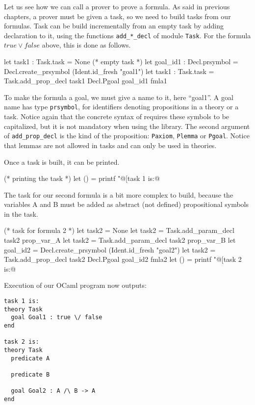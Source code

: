Let us see how we can call a prover to prove a formula. As said in
previous chapters, a prover must be given a task, so we need to build
tasks from our formulas. Task can be build incrementally from an empty
task by adding declaration to it, using the functions
\texttt{add\_*\_decl} of module \texttt{Task}. For the formula $\mathit{true} \lor
\mathit{false}$ above, this is done as follows.
\begin{ocamlcode}
let task1 : Task.task = None (* empty task *)
let goal_id1 : Decl.prsymbol =
  Decl.create_prsymbol (Ident.id_fresh "goal1")
let task1 : Task.task =
  Task.add_prop_decl task1 Decl.Pgoal goal_id1 fmla1
\end{ocamlcode}
To make the formula a goal, we must give a name to it, here ``goal1''. A
goal name has type \texttt{prsymbol}, for identifiers denoting
propositions in a theory or a task. Notice again that the concrete
syntax of \why requires these symbols to be capitalized, but it is not
mandatory when using the library. The second argument of
\texttt{add\_prop\_decl} is the kind of the proposition:
\texttt{Paxiom}, \texttt{Plemma} or \texttt{Pgoal}.
Notice that lemmas are not allowed in tasks
and can only be used in theories.

Once a task is built, it can be printed.
\begin{ocamlcode}
(* printing the task *)
let () = printf "@[task 1 is:@\n%
\end{ocamlcode}

The task for our second formula is a bit more complex to build, because
the variables A and B must be added as abstract (\ie not defined)
propositional symbols in the task.
\begin{ocamlcode}
(* task for formula 2 *)
let task2 = None
let task2 = Task.add_param_decl task2 prop_var_A
let task2 = Task.add_param_decl task2 prop_var_B
let goal_id2 = Decl.create_prsymbol (Ident.id_fresh "goal2")
let task2 = Task.add_prop_decl task2 Decl.Pgoal goal_id2 fmla2
let () = printf "@[task 2 is:@\n%
\end{ocamlcode}

Execution of our OCaml program now outputs:
\begin{verbatim}
task 1 is:
theory Task
  goal Goal1 : true \/ false
end

task 2 is:
theory Task
  predicate A

  predicate B

  goal Goal2 : A /\ B -> A
end
\end{verbatim}

